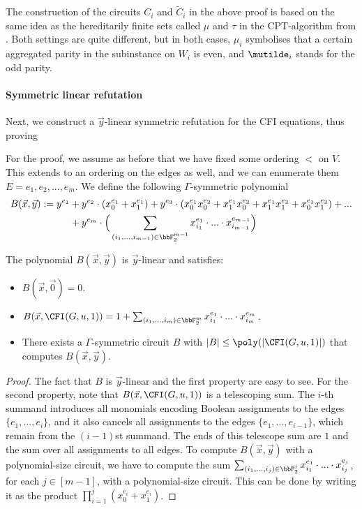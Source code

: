 \documentclass[a4paper,UKenglish,cleveref, autoref, thm-restate]{lipics-v2021}
\begin{document}
The construction of the circuits $C_i$ and $\widetilde{C}_i$ in the above proof is based on the same idea as the hereditarily finite sets called $\mu$ and $\tau$ in the CPT-algorithm from \cite{dawar2008}. Both settings are quite different, but in both cases, $\mu_i$ symbolises that a certain aggregated parity in the subinstance on $W_i$ is even, and $\mutilde_i$ stands for the odd parity. 




\paragraph*{Symmetric linear refutation}

Next, we construct a $\vec y$-linear symmetric refutation for the CFI equations, thus proving

\CFIupperboundLinear*
For the proof, we assume as before that we have
fixed some ordering $<$ on $V$. This extends to an ordering on the edges as well, and we can enumerate them $E = e_1,e_2,...,e_m$. We define the following $\Gamma$-symmetric polynomial
\begin{align*}
	B(\vec x, \vec y) := y^{e_1} &+ y^{e_2} \cdot (x^{e_1}_0+x^{e_1}_1) + y^{e_3} \cdot (x^{e_1}_0x^{e_2}_0 + x^{e_1}_1x^{e_2}_0 + x^{e_1}_1x^{e_2}_1 + x^{e_1}_0x^{e_2}_1) + ... \\
	&+ y^{e_m} \cdot \Big( \sum_{(i_1,...,i_{m-1}) \in \bbF_2^{m-1}} x^{e_1}_{i_1} \cdot ... \cdot x^{e_{m-1}}_{i_{m-1}} \Big)
\end{align*}
\begin{lemma}
	\label{lem:Bcomputable}
	The polynomial $B(\vec x, \vec y)$ is $\vec y$-linear and satisfies: 
	\begin{itemize}
		\item $B(\vec x, \vec 0) = 0$.
		\item $B(\vec x, \CFI(G,u,1)) = 1 + \sum_{(i_1,...,i_{m}) \in \bbF_2^{m}} x^{e_1}_{i_1} \cdot ... \cdot x^{e_{m}}_{i_{m}}$. 
		\item There exists a $\Gamma$-symmetric circuit $B$ with $|B| \leq \poly(| \CFI(G,u,1)|)$ that computes $B(\vec x, \vec y)$.
	\end{itemize}	
\end{lemma}	
\begin{proof}
	The fact that $B$ is $\vec y$-linear and the first property are easy to see. For the second property, note that $B(\vec x, \CFI(G,u,1))$ is a telescoping sum. The $i$-th summand introduces all monomials encoding Boolean assignments to the edges $\{e_1,...,e_i\}$, and it also cancels all assignments to the edges $\{e_1,...,e_{i-1}\}$, which remain from the $(i-1)$st summand. The ends of this telescope sum are $1$ and the sum over all assignments to all edges. To compute $B(\vec x, \vec y)$ with a polynomial-size circuit, we have to compute the sum $\sum_{(i_1,...,i_{j}) \in \bbF_2^{j}} x^{e_1}_{i_1} \cdot ... \cdot x^{e_{j}}_{i_{j}}$, for each $j \in [m-1]$, with a polynomial-size circuit. This can be done by writing it as the product $\prod_{i=1}^j (x^{e_i}_0 + x^{e_i}_1)$.    
\end{proof}		
\end{document}
